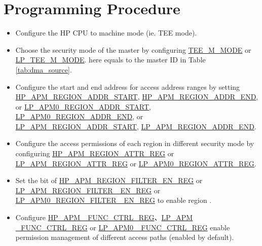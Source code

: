 \documentclass[main\_\_EN.tex]{subfiles}
\begin{document}
\section{Programming Procedure}


\begin{itemize}

    \item Configure the HP CPU to machine mode (ie. TEE mode).
    \item Choose the security mode of the master by configuring \hyperref[fielddesc:TEEM0MODE]{TEE\_M\_MODE} or \hyperref[fielddesc:LPTEEM0MODE]{LP\_TEE\_M\_MODE}.  here equals to the master ID in Table \ref{tab:dma_source}. 
    
    \item Configure the start and end address for access address ranges by setting  \hyperref[regdesc:HPAPMREGION0ADDRSTARTREG]{HP\_APM\_REGION\_ADDR\_START}, \hyperref[regdesc:HPAPMREGION0ADDRENDREG]{HP\_APM\_REGION\_ADDR\_END}, or \hyperref[fielddesc:LPAPM0REGION0ADDRSTART]{LP\_APM0\_REGION\_ADDR\_START}, \hyperref[fielddesc:LPAPM0REGION0ADDREND]{LP\_APM0\_REGION\_ADDR\_END}, or \hyperref[fielddesc:LPAPMREGION0ADDRSTART]{LP\_APM\_REGION\_ADDR\_START}, \hyperref[fielddesc:LPAPMREGION0ADDREND]{LP\_APM\_REGION\_ADDR\_END}.
    
    \item Configure the access permissions of each region in different security mode by configuring \hyperref[regdesc:HPAPMREGION0ATTRREG]{HP\_APM\_REGION\_ATTR\_REG} or \hyperref[regdesc:LPAPMREGION0ATTRREG]{LP\_APM\_REGION\_ATTR\_REG} or \hyperref[regdesc:LPAPM0REGION0ATTRREG]{LP\_APM0\_REGION\_ATTR\_REG}.
    
    \item Set the bit  of \hyperref[fielddesc:HPAPMREGIONFILTEREN]{HP\_APM\_REGION\_FILTER\_EN\_REG} or \hyperref[fielddesc:LPAPMREGIONFILTEREN]{LP\_APM\_REGION\_FILTER\_ EN\_REG} or \hyperref[fielddesc:LPAPM0REGIONFILTEREN]{LP\_APM0\_REGION\_FILTER\_ EN\_REG} to enable region .
    
    \item Configure \hyperref[regdesc:HPAPMFUNCCTRLREG]{HP\_APM\_ FUNC\_CTRL\_REG}、\hyperref[regdesc:LPAPMFUNCCTRLREG]{LP\_APM \_FUNC\_CTRL\_REG} or \hyperref[regdesc:LPAPM0FUNCCTRLREG]{LP\_APM0 \_FUNC\_CTRL\_REG} enable permission management of different access paths (enabled by default).
    
\end{itemize}
\end{document}
